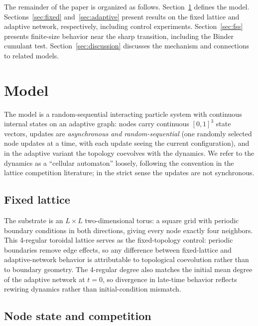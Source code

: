 \documentclass[preprint,12pt]{elsarticle}
\newcommand{\Lsys}{L}                 %
\begin{document}
The remainder of the paper is organized as follows.
Section~\ref{sec:model} defines the model.
Sections~\ref{sec:fixed} and~\ref{sec:adaptive} present results
on the fixed lattice and adaptive network, respectively,
including control experiments.
Section~\ref{sec:fss} presents finite-size behavior near the
sharp transition, including the Binder cumulant test.
Section~\ref{sec:discussion} discusses the mechanism
and connections to related models.

\section{Model}
\label{sec:model}

The model is a random-sequential interacting particle system
with continuous internal states on an adaptive graph: nodes
carry continuous $[0,1]^3$ state vectors, updates are
\emph{asynchronous and random-sequential} (one randomly selected
node updates at a time, with each update seeing the current
configuration), and in the adaptive variant the topology
coevolves with the dynamics.
We refer to the dynamics as a ``cellular automaton'' loosely,
following the convention in the lattice competition literature;
in the strict sense the updates are not synchronous.

\subsection{Fixed lattice}

The substrate is an $\Lsys \times \Lsys$ two-dimensional torus:
a square grid with periodic boundary conditions in both directions,
giving every node exactly four neighbors.
This 4-regular toroidal lattice serves as the fixed-topology
control: periodic boundaries remove edge effects, so any
difference between fixed-lattice and adaptive-network behavior
is attributable to topological coevolution rather than to
boundary geometry.
The 4-regular degree also matches the initial mean degree of the
adaptive network at $t = 0$, so divergence in late-time behavior
reflects rewiring dynamics rather than initial-condition mismatch.

\subsection{Node state and competition}
\end{document}
